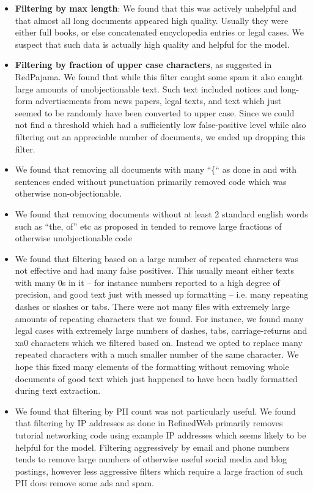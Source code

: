 \documentclass{article}
\begin{document}
\begin{itemize}
    \item \textbf{Filtering by max length}: We found that this was actively unhelpful and that almost all long documents appeared high quality. Usually they were either full books, or else concatenated encyclopedia entries or legal cases. We suspect that such data is actually high quality and helpful for the model.
    \item \textbf{Filtering by fraction of upper case characters}, as suggested in RedPajama. We found that while this filter caught some spam it also caught large amounts of unobjectionable text. Such text included notices and long-form advertisements from news papers, legal texts, and text which just seemed to be randomly have been converted to upper case. Since we could not find a threshold which had a sufficiently low false-positive level while also filtering out an appreciable number of documents, we ended up dropping this filter.
    \item We found that removing all documents with many “\{“ as done in \citet{kudugunta2024madlad} and with sentences ended without punctuation \cite{raffel2020exploring} primarily removed code which was otherwise non-objectionable.
    \item We found that removing documents without at least 2 standard english words such as “the, of” etc as proposed in \citet{rae2021scaling} tended to remove large fractions of otherwise unobjectionable code
    \item We found that filtering based on a large number of repeated characters was not effective and had many false positives. This usually meant either texts with many 0s in it – for instance numbers reported to a high degree of precision, and good text just with messed up formatting – i.e. many repeating dashes or slashes or tabs. There were not many files with extremely large amounts of repeating characters that we found. For instance, we found many legal cases with extremely large numbers of dashes, tabs, carriage-returns and \\xa0 characters which we filtered based on. Instead we opted to replace many repeated characters with a much smaller number of the same character. We hope this fixed many elements of the formatting without removing whole documents of good text which just happened to have been badly formatted during text extraction.
    \item We found that filtering by PII count was not particularly useful. We found that filtering by IP addresses as done in RefinedWeb \citep{penedo2023refinedweb} primarily removes tutorial networking code using example IP addresses which seems likely to be helpful for the model. Filtering aggressively by email and phone numbers tends to remove large numbers of otherwise useful social media and blog postings, however less aggressive filters which require a large fraction of such PII does remove some ads and spam.

\end{itemize}
\end{document}

